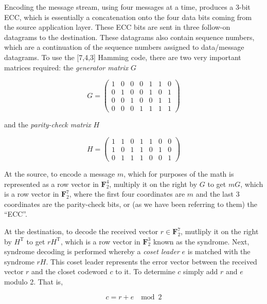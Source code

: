 \documentclass[conference]{IEEEtran}
\theoremstyle{definition}
\begin{document}
Encoding the message stream, using four messages
at a time, produces a 3-bit ECC, which is essentially
a concatenation onto the four data bits coming from the
source application layer.  These ECC bits are sent in
three follow-on datagrams to the destination. These
datagrams also contain sequence numbers, which are a
continuation of the sequence numbers assigned to
data/message datagrams.  To use the [7,4,3] Hamming
code, there are two very important matrices required:
the \emph{generator matrix} $G$

$$
G = \left( 
\begin{matrix}
  1 & 0 & 0 & 0 & 1 & 1 & 0 \\
  0 & 1 & 0 & 0 & 1 & 0 & 1 \\
  0 & 0 & 1 & 0 & 0 & 1 & 1 \\
  0 & 0 & 0 & 1 & 1 & 1 & 1
 \end{matrix}
\right)
$$

and the \emph{parity-check matrix} $H$

$$
H = \left( 
\begin{matrix}
  1 & 1 & 0 & 1 & 1 & 0 & 0 \\
  1 & 0 & 1 & 1 & 0 & 1 & 0 \\
  0 & 1 & 1 & 1 & 0 & 0 & 1
 \end{matrix}
\right)
$$


At the source, to encode a message $m$, which for purposes
of the math is represented as a row vector in $\mathbf{F}^4_2$,
multiply it on the right by $G$ to get $mG$, which is
a row vector in $\mathbf{F}^7_2$, where the first four
coordinates are $m$ and the last 3 coordinates are the
parity-check bits, or (as we have been referring to
them) the ``ECC''.

At the destination, to decode the received vector $r\in\mathbf{F}^7_2$,
mutliply it on the right by $H^\text{T}$ to get $rH^\text{T}$, which is
a row vector in $\mathbf{F}^3_2$ known as the syndrome.  Next, syndrome
decoding is performed whereby a \emph{coset leader} $e$ is matched
with the syndrome $rH$. This coset leader represents the error vector
between the received vector $r$ and the closet codeword $c$ to it. To
determine $c$ simply add $r$ and $e$ modulo 2.  That is,

$$
c = r + e\; \mod 2
$$
\end{document}
